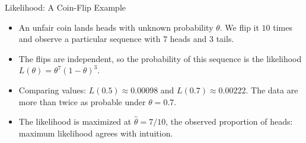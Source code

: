 \begin{frame}{Likelihood: A Coin-Flip Example}
    \begin{itemize}
        \item An unfair coin lands heads with unknown probability $\theta$. We flip it $10$ times and observe a particular sequence with $7$ heads and $3$ tails.
        \item The flips are independent, so the probability of this sequence is the likelihood $L(\theta) = \theta^{7} (1 - \theta)^{3}$.
        \item Comparing values: $L(0.5) \approx 0.00098$ and $L(0.7) \approx 0.00222$. The data are more than twice as probable under $\theta = 0.7$.
        \item The likelihood is maximized at $\hat{\theta} = 7/10$, the observed proportion of heads: maximum likelihood agrees with intuition.
    \end{itemize}
\end{frame}


